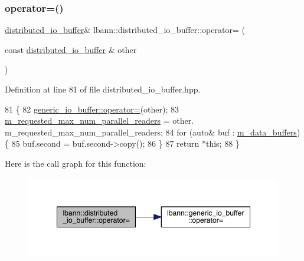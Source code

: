 \subsubsection{\texorpdfstring{operator=()}{operator=()}}
{\footnotesize\ttfamily \hyperlink{classlbann_1_1distributed__io__buffer}{distributed\+\_\+io\+\_\+buffer}\& lbann\+::distributed\+\_\+io\+\_\+buffer\+::operator= (\begin{DoxyParamCaption}\item[{const \hyperlink{classlbann_1_1distributed__io__buffer}{distributed\+\_\+io\+\_\+buffer} \&}]{other }\end{DoxyParamCaption})\hspace{0.3cm}{\ttfamily [inline]}}



Definition at line 81 of file distributed\+\_\+io\+\_\+buffer.\+hpp.


\begin{DoxyCode}
81                                                                        \{
82     \hyperlink{classlbann_1_1generic__io__buffer_ae8d2b80e11cf780def151a425a6b1fa0}{generic\_io\_buffer::operator=}(other);
83     \hyperlink{classlbann_1_1distributed__io__buffer_aa14580fd9d0e8806dc161745525a60dc}{m\_requested\_max\_num\_parallel\_readers} = other.
      m\_requested\_max\_num\_parallel\_readers;
84     \textcolor{keywordflow}{for} (\textcolor{keyword}{auto}& buf : \hyperlink{classlbann_1_1distributed__io__buffer_a59ef8621c57755f73671b782e11dbe89}{m\_data\_buffers}) \{
85       buf.second = buf.second->copy();
86     \}
87     \textcolor{keywordflow}{return} *\textcolor{keyword}{this};
88   \}
\end{DoxyCode}
Here is the call graph for this function\+:\nopagebreak
\begin{figure}[H]
\begin{center}
\leavevmode
\includegraphics[width=348pt]{classlbann_1_1distributed__io__buffer_a021724e36cc803bb8dabd747d1f49035_cgraph}
\end{center}
\end{figure}
\mbox{\label{classlbann_1_1distributed__io__buffer_a6bdf8f670edc92902ee6222dde434c39}} 
